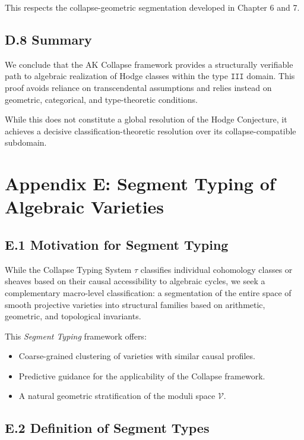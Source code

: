 \documentclass[11pt]{article}
\begin{document}
This respects the collapse-geometric segmentation developed in Chapter 6 and 7.

\subsection*{D.8 Summary}

We conclude that the AK Collapse framework provides a structurally verifiable path to algebraic realization of Hodge classes within the type $\texttt{III}$ domain.  
This proof avoids reliance on transcendental assumptions and relies instead on geometric, categorical, and type-theoretic conditions.

While this does not constitute a global resolution of the Hodge Conjecture, it achieves a decisive classification-theoretic resolution over its collapse-compatible subdomain.



\section*{Appendix E: Segment Typing of Algebraic Varieties}


\subsection*{E.1 Motivation for Segment Typing}

While the Collapse Typing System $\tau$ classifies individual cohomology classes or sheaves based on their causal accessibility to algebraic cycles, we seek a complementary macro-level classification:  
a segmentation of the entire space of smooth projective varieties into structural families based on arithmetic, geometric, and topological invariants.

This \emph{Segment Typing} framework offers:

\begin{itemize}
  \item Coarse-grained clustering of varieties with similar causal profiles.
  \item Predictive guidance for the applicability of the Collapse framework.
  \item A natural geometric stratification of the moduli space $\mathcal{V}$.
\end{itemize}

\subsection*{E.2 Definition of Segment Types}
\end{document}
